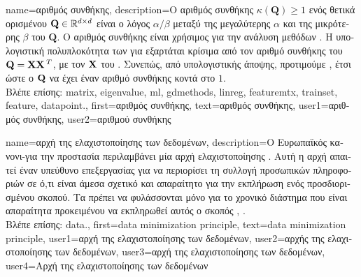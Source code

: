 {name={\foreignlanguage{greek}{αριθμός συνθήκης}},
	description={\foreignlanguage{greek}{O αριθμός συνθήκης} 
		$\kappa(\mathbf{Q}) \geq 1$ \foreignlanguage{greek}{ενός θετικά ορισμένου}  
		$\mathbf{Q} \in \mathbb{R}^{d \times d}$ \foreignlanguage{greek}{είναι ο  
		λόγος $\alpha /\beta $ μεταξύ της μεγαλύτερης $\alpha$ και της μικρότερης $\beta$}  \foreignlanguage{greek}{του} 
		$\mathbf{Q}$. \foreignlanguage{greek}{O αριθμός συνθήκης είναι χρήσιμος για την ανάλυση μεθόδων} . 
		\foreignlanguage{greek}{Η υπολογιστική πολυπλοκότητα των}  \foreignlanguage{greek}{για}  
		\foreignlanguage{greek}{εξαρτάται κρίσιμα από τον αριθμό συνθήκης του}  $\mathbf{Q} = {\bf X} {\bf X}\,^{T}$, 
		\foreignlanguage{greek}{με τον}  ${\bf X}$ 
		\foreignlanguage{greek}{του} . \foreignlanguage{greek}{Συνεπώς, από υπολογιστικής άποψης, προτιμούμε}   
		, \foreignlanguage{greek}{έτσι ώστε ο $\mathbf{Q}$ να έχει έναν αριθμό συνθήκης κοντά στο} $1$.\\
		\foreignlanguage{greek}{Βλέπε επίσης:} \gls{matrix}, \gls{eigenvalue}, \gls{ml}, \gls{gdmethods}, \gls{linreg}, \gls{featuremtx}, \gls{trainset}, 
		\gls{feature}, \gls{datapoint}.},
	first={\foreignlanguage{greek}{αριθμός συνθήκης}},
	text={\foreignlanguage{greek}{αριθμός συνθήκης}},
	user1={\foreignlanguage{greek}{αριθμός συνθήκης}}, %
	user2={\foreignlanguage{greek}{αριθμού συνθήκης}} %
}

{name={\foreignlanguage{greek}{αρχή της ελαχιστοποίησης των δεδομένων}},
	description={\foreignlanguage{greek}{Ο Ευρωπαϊκός κανονι- για την προστασία}  \foreignlanguage{greek}{περιλαμβάνει μία αρχή ελαχιστο\-ποί\-ησης} . 
		\foreignlanguage{greek}{Αυτή η αρχή απαιτεί έναν υπεύθυνο επεξεργασίας}  \foreignlanguage{greek}{για να περιορίσει  
		τη συλλογή προσωπικών πληροφοριών σε ό,τι είναι άμεσα σχετικό και απαραίτητο για την εκπλήρωση ενός προσδιορισμένου  
		σκοπού. Τα}  \foreignlanguage{greek}{πρέπει να φυλάσσονται μόνο για το χρονικό διάστημα που είναι απαραίτητα προκειμένου να 
		εκπληρωθεί αυτός ο σκοπός} \cite[\foreignlanguage{greek}{Άρθρο} 5(1)(c)]{GDPR2016}, \cite{EURegulation2018}.\\
		\foreignlanguage{greek}{Βλέπε επίσης:} \gls{data}.}, 
	first={data minimization principle},
	text={data minimization principle},
	user1={\foreignlanguage{greek}{αρχή της ελαχιστοποίησης των δεδομένων}}, %
  	user2={\foreignlanguage{greek}{αρχής της ελαχιστοποίησης των δεδομένων}}, %
	user3={\foreignlanguage{greek}{αρχή της ελαχιστοποίησης των δεδομένων}}, %
	user4={\foreignlanguage{greek}{Αρχή της ελαχιστοποίησης των δεδομένων}} %
}

